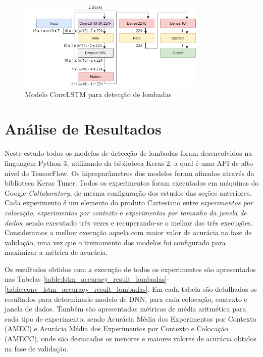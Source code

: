 \begin{figure}[h!]
  \centering
  \caption{Modelo ConvLSTM para detecção de lombadas}
  \label{fig:best_conv_lstm_tipo_lombadas}
  \includegraphics[width=0.8\textwidth]{figuras/fig_44.png}
\end{figure}

\section{Análise de Resultados}

Neste estudo todos os modelos de detecção de lombadas foram desenvolvidos na linguagem Python 3, utilizando da biblioteca Keras 2, a qual é uma API de alto nível do TensorFlow. Os hiperparâmetros dos modelos foram afinados através da biblioteca Keras Tuner. Todos os experimentos foram executados em máquinas do Google \textit{Collaboratory}, de mesma configuração dos estudos das seções anteriores. Cada experimento é um elemento do produto Cartesiano entre \emph{experimentos por colocação}, \emph{experimentos por contexto} e \emph{experimentos por tamanho da janela de dados}, sendo executado três vezes e recuperando-se o melhor das três execuções. Consideramos a melhor execução aquela com maior valor de acurácia na fase de validação, uma vez que o treinamento dos modelos foi configurado para maximizar a métrica de acurácia.

Os resultados obtidos com a execução de todos os experimentos são apresentados nas Tabelas \ref{table:lstm_accuracy_result_lombadas}-\ref{table:conv_lstm_accuracy_result_lombadas}. Em cada tabela são detalhados os resultados para determinado modelo de DNN, para cada colocação, contexto e janela de dados. Também são apresentadas métricas de média aritmética para cada tipo de experimento, sendo Acurácia Média dos Experimentos por Contexto (AMEC) e Acurácia Média dos Experimentos por Contexto e Colocação (AMECC), onde são destacados os menores e maiores valores de acurácia obtidos na fase de validação.

